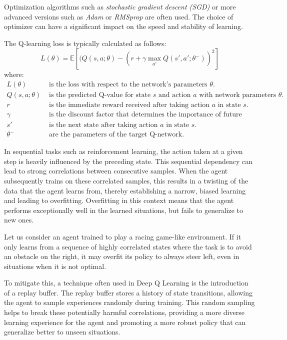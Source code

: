 \documentclass[12pt,a4paper,openright,twoside]{book}
\begin{document}
Optimization algorithms such as \emph{stochastic gradient descent (SGD)} or more advanced versions such as \emph{Adam} or \emph{RMSprop} are often used. The choice of optimizer can have a significant impact on the speed and stability of learning.


The Q-learning loss is typically calculated as follows:
\[
L(\theta) = \mathbb{E}\left[(Q(s, a;\theta) - (r + \gamma \max_{a'}Q(s', a';\theta^-))^2\right]
\]
where:
\begin{align*}
L(\theta) & \text{ is the loss with respect to the network's parameters }\theta. \\
Q(s, a;\theta) & \text{ is the predicted Q-value for state }s\text{ and action }a\text{ with network parameters }\theta. \\
r & \text{ is the immediate reward received after taking action }a\text{ in state }s. \\
\gamma & \text{ is the discount factor that determines the importance of future rewards.} \\
s' & \text{ is the next state after taking action }a\text{ in state }s. \\
\theta^- & \text{ are the parameters of the target Q-network.}
\end{align*}

In sequential tasks such as reinforcement learning, the action taken at a given step is heavily influenced by the preceding state. This sequential dependency can lead to strong correlations between consecutive samples. When the agent subsequently trains on these correlated samples, this results in a twisting of the data that the agent learns from, thereby establishing a narrow, biased learning and leading to overfitting. Overfitting in this context means that the agent performs exceptionally well in the learned situations, but fails to generalize to new ones.

Let us consider an agent trained to play a racing game-like environment. If it only learns from a sequence of highly correlated states where the task is to avoid an obstacle on the right, it may overfit its policy to always steer left, even in situations when it is not optimal.

To mitigate this, a technique often used in Deep Q Learning is the introduction of a replay buffer. The replay buffer stores a history of state transitions, allowing the agent to sample experiences randomly during training. This random sampling helps to break these potentially harmful correlations, providing a more diverse learning experience for the agent and promoting a more robust policy that can generalize better to unseen situations.
\end{document}
